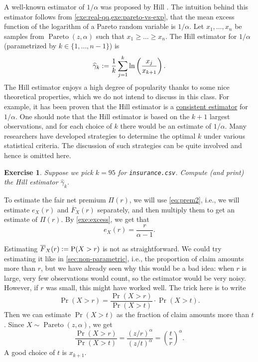 \documentclass[12pt]{article}
\newcommand*{\Fbar}{\overline{F}}
\newcommand*{\gammahat}{\widehat{\gamma}}
\DeclareMathOperator{\Pareto}{Pareto}
\newtheorem{exercise}{Exercise}[section]
\begin{document}
A well-known estimator of $1/\alpha$ was proposed by Hill \cite{hill1975simple}.
The intuition behind this estimator follows from \cref{exe:real-qq,exe:pareto-vs-exp},
that the mean excess function of the logarithm of a Pareto random variable is $1/\alpha$.
Let $x_1, \ldots, x_n$ be samples from $\Pareto(z, \alpha)$ such that $x_1 \ge \ldots \ge x_n$.
The Hill estimator for $1/\alpha$ (parametrized by $k \in \{1, \ldots, n-1\}$) is
\[ \gammahat_k \defeq \frac{1}{k} \sum_{j=1}^k \ln\left(\frac{x_j}{x_{k+1}}\right). \]
The Hill estimator enjoys a high degree of popularity thanks to some nice theoretical properties,
which we do not intend to discuss in this class.
For example, it has been proven that the Hill estimator is a
\href{https://en.wikipedia.org/wiki/Consistent_estimator}{consistent estimator} for $1/\alpha$.
One should note that the Hill estimator is based on the $k+1$ largest observations,
and for each choice of $k$ there would be an estimate of $1/\alpha$.
Many researchers have developed strategies to determine the optimal $k$ under various statistical criteria.
The discussion of such strategies can be quite involved and hence is omitted here.

\begin{tcolorbox}[progExe]
\begin{exercise}
\label{exe:hill}
Suppose we pick $k = 95$ for \texttt{insurance.csv}.
Compute (and print) the Hill estimator $\gammahat_k$.
\end{exercise}
\end{tcolorbox}

To estimate the fair net premium $\Pi(r)$, we will use \cref{eq:prem2},
i.e., we will estimate $e_X(r)$ and $\Fbar_X(r)$ separately,
and then multiply them to get an estimate of $\Pi(r)$.
By \cref{exe:excess}, we get that
\[ e_X(r) = \frac{r}{\alpha - 1}. \]

Estimating $\Fbar_X(r) \defeq \Pr(X > r)$ is not as straightforward.
We could try estimating it like in \cref{sec:non-parametric}, i.e.,
the proportion of claim amounts more than $r$, but we have already seen
why this would be a bad idea: when $r$ is large,
very few observations would count, so the estimator would be very noisy.
However, if $r$ was small, this might have worked well.
The trick here is to write
\[ \Pr(X > r) = \frac{\Pr(X > r)}{\Pr(X > t)}\cdot\Pr(X > t). \]
Then we can estimate $\Pr(X > t)$ as the fraction of claim amounts more than $t$.
Since $X \sim \Pareto(z, \alpha)$, we get
\[ \frac{\Pr(X > r)}{\Pr(X > t)}
    = \frac{(z/r)^{\alpha}}{(z/t)^{\alpha}}
    = \left(\frac{t}{r}\right)^{\alpha}. \]
A good choice of $t$ is $x_{k+1}$.
\end{document}
